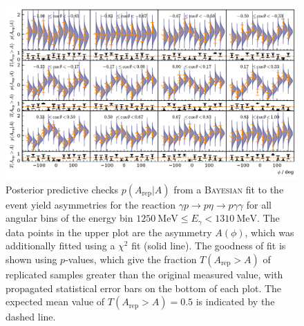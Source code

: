 \begin{figure}
		\centering
		\includegraphics[width=\linewidth]{../bayes/realdeal/plots/ppd_checks.pdf}
		\caption{Posterior predictive checks $p\left(A_\text{rep}\big|A\right)$ from a \textsc{Bayesian} fit to the event yield asymmetries for the reaction $\gamma p\to p\eta\to p\gamma\gamma$ for all angular bins of the energy bin $\SI{1250}{\mega\eV}\leq E_\gamma<\SI{1310}{\mega\eV}$. The data points in the upper plot are the asymmetry $A\left(\phi\right)$, which was additionally fitted using a $\chi^2$ fit (solid line). The goodness of fit is shown using $p$-values, which give the fraction $T\left(A_\text{rep}>A\right)$ of replicated samples greater than the original measured value, with propagated statistical error bars on the bottom of each plot. The expected mean value of $T\left(A_\text{rep}>A\right)=0.5$ is indicated by the dashed line. }
		\label{fig:asym}
\end{figure}


